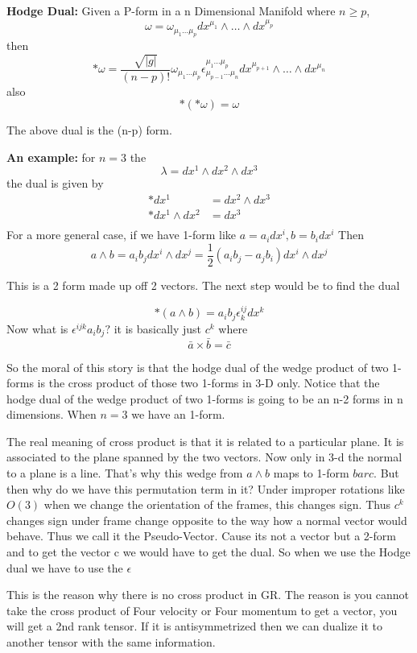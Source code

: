\documentclass{article}
\begin{document}
\begin{theorem}
    \textbf{Hodge Dual:} Given a P-form in a n Dimensional Manifold where \( n \geq p\), 
    \[ \omega = \omega_{\mu_1 \dots \mu_p} dx^{\mu_1} \wedge \dots \wedge dx^{\mu_p}\]
    then \[ *\omega = \frac{\sqrt{|g|} }{(n-p)!} \omega_{\mu_1 \dots \mu_p} \epsilon^{\mu_1 \dots \mu_p}_{\mu_{p-1}\dots\mu_n} dx^{\mu_{p+1}} \wedge \dots \wedge dx^{\mu_n} \] 
    also \[ *(* \omega) = \omega \]
\end{theorem}
The above dual is the (n-p) form.

\textbf{An example: } for \( n = 3 \) the \[ \lambda = dx^1 \wedge dx^2 \wedge dx^3 \]
the dual is given by 
\begin{align*}
    *dx^1  &= dx^2 \wedge dx^3 \\
*dx^1 \wedge dx^2 &= dx^3  \\
\end{align*}
For a more general case, if we have 1-form like \( a = a_i dx^i, b = b_i dx^i \)
Then \[ a \wedge b = a_i b_j dx^i \wedge dx^j = \frac{1}{2} (a_i b_j - a_j b_i) dx^i \wedge dx^j \]

This is a 2 form made up off 2 vectors. The next step would be to find the dual 

\[ * (a \wedge b) = a_i b_j \epsilon^{ij}_k dx^k \]
Now what is \( \epsilon^{ijk} a_i b_j ?\) it is basically just \( c^k \) where 
\[ \bar a \times \bar b = \bar c \]

So the moral of this story is that the hodge dual of the wedge product of two 1-forms is the cross product of those two 1-forms in 3-D only. Notice that the hodge dual of the wedge product of two 1-forms is going to be an n-2 forms in n dimensions. When \( n=3 \) we have an 1-form. 

The real meaning of cross product is that it is related to a particular plane. It is associated to the plane spanned by the two vectors. Now only in 3-d the normal to a plane is a line. That's why this wedge from \( a \wedge b \) maps to 1-form \( bar c \). But then why do we have this permutation term in it? Under improper rotations like \( O(3) \) when we change the orientation of the frames, this changes sign. Thus \( c^k \) changes sign under frame  change opposite to the way how a normal vector would behave. Thus we call it the Pseudo-Vector. Cause its not a vector but a 2-form and to get the vector c we would have to get the dual. So when we use the Hodge dual we have to use the \( \epsilon \) 

This is the reason why there is no cross product in GR. The reason is you cannot take the cross product of Four velocity or Four momentum to get a vector, you will get a 2nd rank tensor. If it is antisymmetrized then we can dualize it to another tensor with the same information. 
\end{document}
